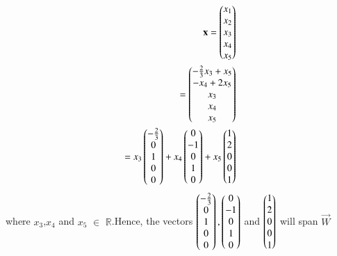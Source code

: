    \begin{align}
   \mathbf{x} = \begin{pmatrix}x_1\\x_2\\x_3 \\ x_4 \\ x_5\end{pmatrix} \\= \begin{pmatrix}-\frac{2}{3}x_3+x_5\\-x_4+2x_5\\x_3 \\ x_4 \\ x_5\end{pmatrix}\\=x_3\begin{pmatrix}-\frac{2}{3}\\0\\1\\0\\0\end{pmatrix} +x_4\begin{pmatrix}0\\-1\\0\\1\\0\end{pmatrix}+x_5\begin{pmatrix}1\\2\\0\\0\\1\end{pmatrix}
\end{align}
where $x_3$,$x_4$ and $x_5$ $\in$ $\mathbb{R}$.Hence, the vectors $\begin{pmatrix}-\frac{2}{3}\\0\\1\\0\\0\end{pmatrix},\begin{pmatrix}0\\-1\\0\\1\\0\end{pmatrix}$ and $\begin{pmatrix}1\\2\\0\\0\\1\end{pmatrix}$ will span $\vec{W}$
